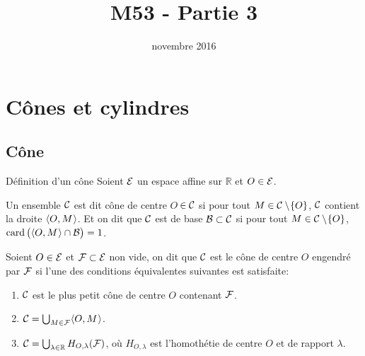 \documentclass[11pt]{m53beamer}
\title{M53 - Partie 3}
\date{novembre 2016}
\begin{document}
\begin{frame}
  \titlepage
\end{frame}

\section{Cônes et cylindres}

\subsection{Cône}

\begin{frame}{Définition d'un cône}
  Soient $\mathcal{E}$ un espace affine sur $\mathbb{R}$ et $O \in \mathcal{E}$.\pause
  \begin{definition}
    Un ensemble $\mathcal{C}$ est dit \alert{cône de centre $O$}\,$\in \mathcal{C}$ si pour tout $M \in \mathcal{C}\setminus\!\{O\}$, $\mathcal{C}$ contient la droite $\langle{O,M}\kern.07em\rangle$.\pause{}
    Et on dit que $\mathcal{C}$ est de \alert{base} $\mathcal{B} \subset \mathcal{C}$ si pour tout $M \in \mathcal{C}\setminus\!\{O\}$, $\operatorname{card}\big(\langle{O,M}\kern.07em\rangle \cap \mathcal{B}\big)=1$.
  \end{definition}\pause
  \begin{defprop}
    Soient $O \in \mathcal{E}$ et $\mathcal{F} \subset \mathcal{E}$ non vide, on dit que $\mathcal{C}$ est \alert{le cône de centre $O$ engendré par $\mathcal{F}$} si l'une des conditions équivalentes suivantes est satisfaite:
    \begin{enumerate}[<+(1)->]
         \item $\mathcal{C}$ est le plus petit cône de centre $O$ contenant $\mathcal{F}$.
         \item $\mathcal{C}=\bigcup_{M \in \mathcal{F}} \langle{O,M}\kern.07em\rangle$.
         \item $\mathcal{C}=\bigcup_{\lambda \in \mathbb{R}} H_{O,\lambda}(\mathcal{F})$, où $H_{O,\lambda}$ est l'homothétie de centre $O$ et de rapport $\lambda$.
       \end{enumerate}
  \end{defprop}
\end{frame}
\end{document}
